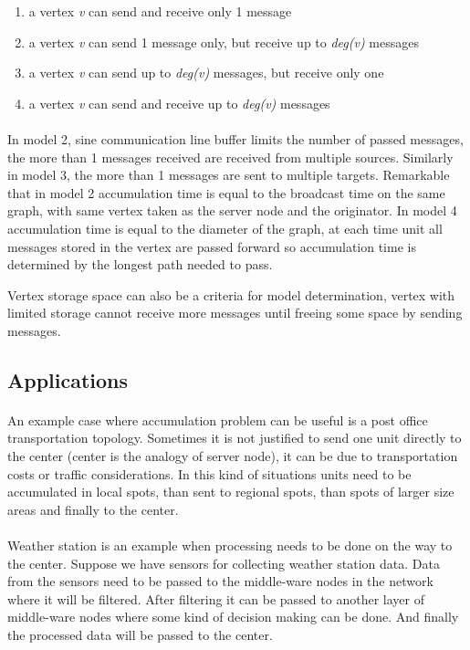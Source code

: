 \documentclass[a4paper,TexShade]{class}
\begin{document}
\bigskip
\begin{enumerate}
\item a vertex \textit{v} can send and receive only 1 message
\item a vertex \textit{v} can send 1 message only, but receive up to \textit{deg(v)} messages
\item a vertex \textit{v} can send up to \textit{deg(v)} messages, but receive only one
\item a vertex \textit{v} can send and receive up to \textit{deg(v)} messages
\end{enumerate}

\bigskip
\paragraph{} In model 2, sine communication line buffer limits the number of passed messages, the more than 1 messages received are received from multiple sources. Similarly in model 3, the more than 1 messages are sent to multiple targets. Remarkable that in model 2 accumulation time is equal to the broadcast time on the same graph, with same vertex taken as the server node and the originator. In model 4 accumulation time is equal to the diameter of the graph, at each time unit all messages stored in the vertex are passed forward so accumulation time is determined by the longest path needed to pass.

Vertex storage space can also be a criteria for model determination, vertex with limited storage cannot receive more messages until freeing some space by sending messages. 


\subsection{Applications} \label{applications}
\paragraph{} An example case where accumulation problem can be useful is a post office transportation topology. Sometimes it is not justified to send one unit directly to the center (center is the analogy of server node), it can be due to transportation costs or traffic considerations. In this kind of situations units need to be accumulated in local spots, than sent to regional spots, than spots of larger size areas and finally to the center.

\paragraph{} Weather station is an example when processing needs to be done on the way to the center. Suppose we have sensors for collecting weather station data. Data from the sensors need to be passed to the middle-ware nodes in the network where it will be filtered. After filtering it can be passed to another layer of middle-ware nodes where some kind of decision making can be done. And finally the processed data will be passed to the center.
\end{document}
